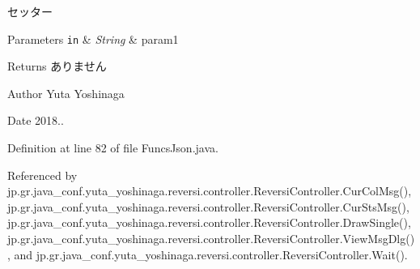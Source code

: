 セッター 


\begin{DoxyParams}[1]{Parameters}
\mbox{\tt in}  & {\em String} & param1 \\
\hline
\end{DoxyParams}
\begin{DoxyReturn}{Returns}
ありません 
\end{DoxyReturn}
\begin{DoxyAuthor}{Author}
Yuta Yoshinaga 
\end{DoxyAuthor}
\begin{DoxyDate}{Date}
2018.. 
\end{DoxyDate}


Definition at line 82 of file Funcs\+Json.\+java.



Referenced by jp.\+gr.\+java\+\_\+conf.\+yuta\+\_\+yoshinaga.\+reversi.\+controller.\+Reversi\+Controller.\+Cur\+Col\+Msg(), jp.\+gr.\+java\+\_\+conf.\+yuta\+\_\+yoshinaga.\+reversi.\+controller.\+Reversi\+Controller.\+Cur\+Sts\+Msg(), jp.\+gr.\+java\+\_\+conf.\+yuta\+\_\+yoshinaga.\+reversi.\+controller.\+Reversi\+Controller.\+Draw\+Single(), jp.\+gr.\+java\+\_\+conf.\+yuta\+\_\+yoshinaga.\+reversi.\+controller.\+Reversi\+Controller.\+View\+Msg\+Dlg(), and jp.\+gr.\+java\+\_\+conf.\+yuta\+\_\+yoshinaga.\+reversi.\+controller.\+Reversi\+Controller.\+Wait().

